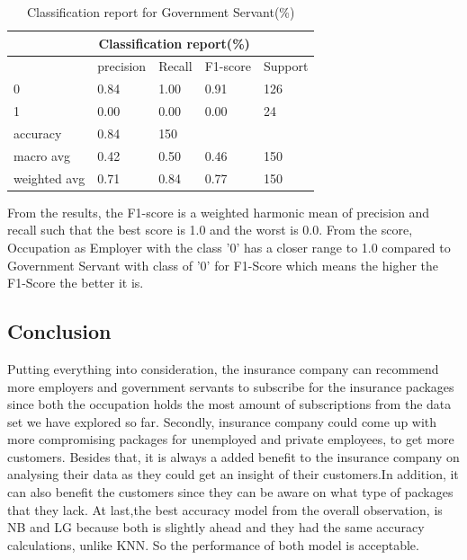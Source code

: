 \documentclass[11pt]{article}
\begin{document}
\begin{table}
\centering
\caption{Classification report for Government Servant(\%)}
\label{Classification report for Government Servant(\%)}
\begin{tabular}{p{3cm}p{2cm}p{2cm}p{2cm}p{2cm}}
\hline
            & \multicolumn{3}{c}{Classification report(\%)}     \\ \hline
             & precision & Recall    & F1-score & Support       \\ \hline
0            & 0.84      & 1.00      & 0.91    & 126            \\ 
1            & 0.00      & 0.00      & 0.00    & 24             \\ \hline 
accuracy                             & 0.84    & 150            \\ \hline 
macro avg    & 0.42      & 0.50      & 0.46    & 150            \\ \hline 
weighted avg & 0.71      & 0.84      & 0.77    & 150            \\ \hline 
\end{tabular}
\end{table}


\hspace{0.5cm} 
From the results, the F1-score is a weighted harmonic mean of precision and recall such that the best score is 1.0 and the worst is 0.0. From the score, Occupation as Employer with the class '0' has a closer range to 1.0 compared to Government Servant with class of '0' for F1-Score which means the higher the F1-Score the better it is.
\subsection{Conclusion}

\hspace{0.5cm} 
Putting everything into consideration, the insurance company can recommend more employers and government servants to subscribe for the insurance packages since both the occupation holds the most amount of subscriptions from the data set we have explored so far. Secondly, insurance company could come up with more compromising packages for unemployed and private employees, to get more customers. Besides that, it is always a added benefit to the insurance company on analysing their data as they could get an insight of their customers.In addition, it can also benefit the customers since they can be aware on what type of packages that they lack. At last,the best accuracy model from the overall observation, is NB and LG because both is slightly ahead and they had the same accuracy calculations, unlike KNN. So the performance of both model is acceptable.
\end{document}
